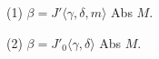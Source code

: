 (1) $\beta = J' \langle \gamma, \delta, m \rangle$ Abs $M$.

(2) $\beta = J'_0 \langle \gamma, \delta \rangle$ Abs $M$.
